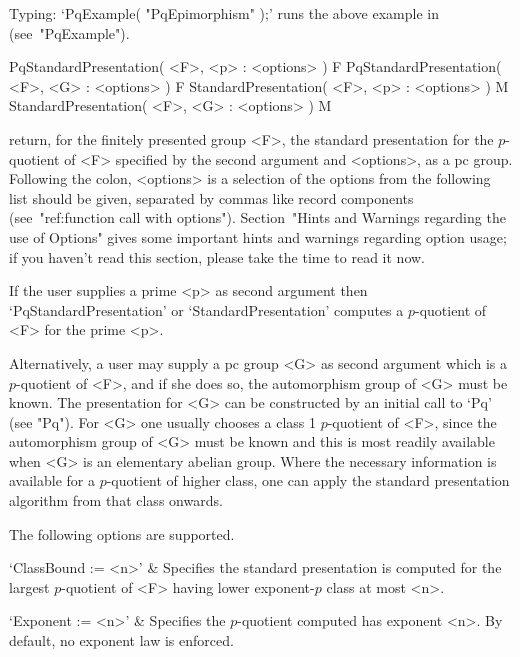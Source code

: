 Typing: `PqExample( "PqEpimorphism" );' runs the above example in  {\GAP}
(see~"PqExample").


\>PqStandardPresentation( <F>, <p> : <options> ) F
\>PqStandardPresentation( <F>, <G> : <options> ) F
\>StandardPresentation( <F>, <p> : <options> ) M
\>StandardPresentation( <F>, <G> : <options> ) M

return, for the finitely presented group <F>, the  standard  presentation
for the  $p$-quotient  of  <F>  specified  by  the  second  argument  and
<options>, as a pc group. Following the colon, <options> is  a  selection
of the options from the following list  should  be  given,  separated  by
commas like record components  (see~"ref:function  call  with  options").
Section~"Hints and Warnings regarding the  use  of  Options"  gives  some
important hints and warnings regarding option usage; if you haven't  read
this section, please take the time to read it now.

If  the  user  supplies   a   prime   <p>   as   second   argument   then
`PqStandardPresentation'    or    `StandardPresentation'    computes    a
$p$-quotient of <F> for the prime <p>.

Alternatively, a user may supply a pc group <G> as second argument  which
is a $p$-quotient of <F>, and if she does so, the automorphism  group  of
<G> must be known. The presentation for <G>  can  be  constructed  by  an
initial call to `Pq' (see "Pq"). For <G> one usually chooses  a  class  1
$p$-quotient of <F>, since the automorphism group of <G>  must  be  known
and this is most readily available when  <G>  is  an  elementary  abelian
group. Where the necessary information is available for a $p$-quotient of
higher class, one can apply the standard presentation algorithm from that
class onwards.

The following options are supported.

\beginitems
{}
`ClassBound := <n>' &
Specifies  the  standard  presentation  is  computed  for   the   largest
$p$-quotient of <F> having lower expon\-ent-$p$ class at most <n>.

`Exponent := <n>' &
Specifies the $p$-quotient computed has  exponent  <n>.  By  default,  no
exponent law is enforced.

